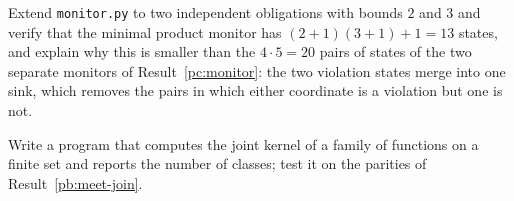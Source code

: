 \begin{exercise}
Extend \texttt{monitor.py} to two independent obligations with bounds $2$ and $3$ and verify that the minimal product monitor has $(2+1)(3+1)+1=13$ states, and explain why this is smaller than the $4\cdot5=20$ pairs of states of the two separate monitors of Result~\ref{pc:monitor}: the two violation states merge into one sink, which removes the pairs in which either coordinate is a violation but one is not.
\end{exercise}

\begin{exercise}
Write a program that computes the joint kernel of a family of functions on a finite set and reports the number of classes; test it on the parities of Result~\ref{pb:meet-join}.
\end{exercise}
